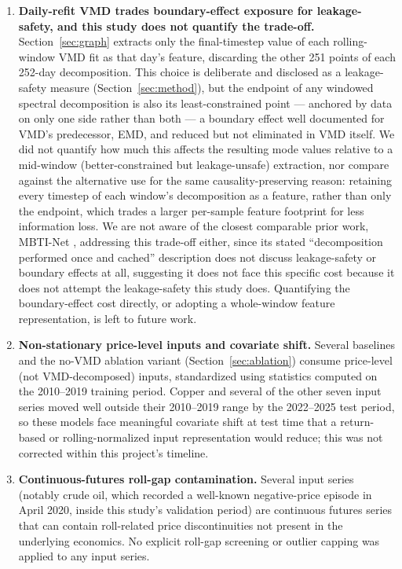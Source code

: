 \documentclass[journal]{IEEEtran}
\begin{document}
\begin{enumerate}
    \item \textbf{Daily-refit VMD trades boundary-effect exposure for leakage-safety, and this study does not quantify the trade-off.} Section~\ref{sec:graph} extracts only the final-timestep value of each rolling-window VMD fit as that day's feature, discarding the other 251 points of each 252-day decomposition. This choice is deliberate and disclosed as a leakage-safety measure (Section~\ref{sec:method}), but the endpoint of any windowed spectral decomposition is also its least-constrained point --- anchored by data on only one side rather than both --- a boundary effect well documented for VMD's predecessor, EMD, and reduced but not eliminated in VMD itself. We did not quantify how much this affects the resulting mode values relative to a mid-window (better-constrained but leakage-unsafe) extraction, nor compare against the alternative \citet{Feng2026} use for the same causality-preserving reason: retaining every timestep of each window's decomposition as a feature, rather than only the endpoint, which trades a larger per-sample feature footprint for less information loss. We are not aware of the closest comparable prior work, MBTI-Net \citep{LiLiu2026}, addressing this trade-off either, since its stated ``decomposition performed once and cached'' description does not discuss leakage-safety or boundary effects at all, suggesting it does not face this specific cost because it does not attempt the leakage-safety this study does. Quantifying the boundary-effect cost directly, or adopting a whole-window feature representation, is left to future work.
    \item \textbf{Non-stationary price-level inputs and covariate shift.} Several baselines and the no-VMD ablation variant (Section~\ref{sec:ablation}) consume price-level (not VMD-decomposed) inputs, standardized using statistics computed on the 2010--2019 training period. Copper and several of the other seven input series moved well outside their 2010--2019 range by the 2022--2025 test period, so these models face meaningful covariate shift at test time that a return-based or rolling-normalized input representation would reduce; this was not corrected within this project's timeline.
    \item \textbf{Continuous-futures roll-gap contamination.} Several input series (notably crude oil, which recorded a well-known negative-price episode in April 2020, inside this study's validation period) are continuous futures series that can contain roll-related price discontinuities not present in the underlying economics. No explicit roll-gap screening or outlier capping was applied to any input series.

\end{enumerate}
\end{document}
